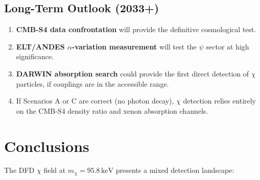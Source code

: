 \documentclass[12pt,a4paper]{article}
\newcommand{\keV}{\,\mathrm{keV}}
\begin{document}
\subsection{Long-Term Outlook (2033+)}

\begin{enumerate}
\item \textbf{CMB-S4 data confrontation} will provide the
definitive cosmological test.

\item \textbf{ELT/ANDES $\alpha$-variation measurement} will
test the $\psi$ sector at high significance.

\item \textbf{DARWIN absorption search} could provide the first
direct detection of $\chi$ particles, if couplings are in the
accessible range.

\item If Scenarios A or C are correct (no photon decay),
$\chi$ detection relies entirely on the CMB-S4 density ratio
and xenon absorption channels.
\end{enumerate}

\section{Conclusions}

The DFD $\chi$ field at $m_\chi = 95.8\keV$ presents a mixed
detection landscape:
\end{document}
